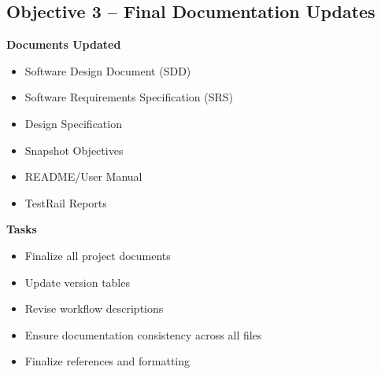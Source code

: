 \documentclass[12pt]{article}
\begin{document}
\subsection{Objective 3 -- Final Documentation Updates}

\textbf{Documents Updated}

\begin{itemize}
    \item Software Design Document (SDD)
    \item Software Requirements Specification (SRS)
    \item Design Specification
    \item Snapshot Objectives
    \item README/User Manual
    \item TestRail Reports
\end{itemize}

\textbf{Tasks}

\begin{itemize}
    \item Finalize all project documents
    \item Update version tables
    \item Revise workflow descriptions
    \item Ensure documentation consistency across all files
    \item Finalize references and formatting
\end{itemize}
\end{document}
